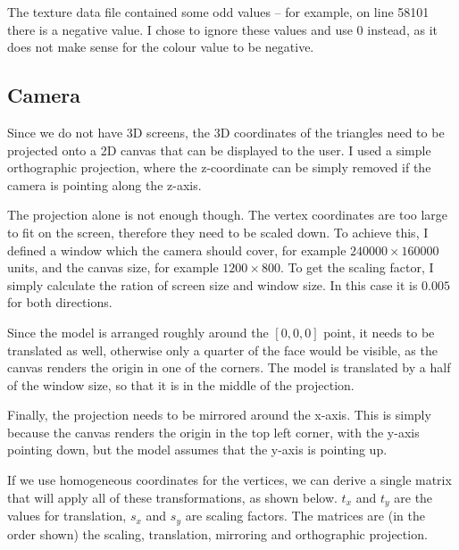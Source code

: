 \documentclass[]{article}
\begin{document}
The texture data file contained some odd values -- for example, on line 58101 there is a negative value. I chose to ignore these values and use 0 instead, as it does not make sense for the colour value to be negative.

\subsection{Camera}

Since we do not have 3D screens, the 3D coordinates of the triangles need to be projected onto a 2D canvas that can be displayed to the user. I used a simple orthographic projection, where the z-coordinate can be simply removed if the camera is pointing along the z-axis.

The projection alone is not enough though. The vertex coordinates are too large to fit on the screen, therefore they need to be scaled down. To achieve this, I defined a window which the camera should cover, for example $240000 \times 160000$ units, and the canvas size, for example $1200 \times 800$. To get the scaling factor, I simply calculate the ration of screen size and window size. In this case it is $0.005$ for both directions.

Since the model is arranged roughly around the $[0, 0, 0]$ point, it needs to be translated as well, otherwise only a quarter of the face would be visible, as the canvas renders the origin in one of the corners. The model is translated by a half of the window size, so that it is in the middle of the projection.

Finally, the projection needs to be mirrored around the x-axis. This is simply because the canvas renders the origin in the top left corner, with the y-axis pointing down, but the model assumes that the y-axis is pointing up.

If we use homogeneous coordinates for the vertices, we can derive a single matrix that will apply all of these transformations, as shown below. $t_x$ and $t_y$ are the values for translation, $s_x$ and $s_y$ are scaling factors. The matrices are (in the order shown) the scaling, translation, mirroring and orthographic projection.
\end{document}
